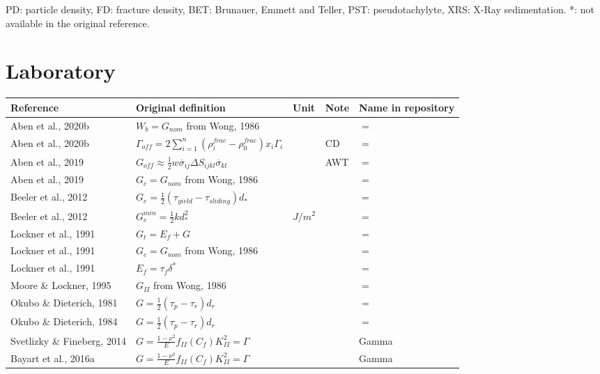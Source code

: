 \documentclass[12pt]{article}
\begin{document}
PD: particle density, FD: fracture density, BET: Brunauer, Emmett and Teller, PST: pseudotachylyte, XRS: X-Ray sedimentation.
*: not available in the original reference.

\section{Laboratory}

\begin{longtable}{|p{3.5 cm}|p{6.5 cm}|p{1.25 cm}|p{1.25 cm}|p{1.5 cm}|}
\hline
\textbf{Reference} & \textbf{Original definition} & \textbf{Unit} & \textbf{Note} & \textbf{Name in repository} \\ \hline
Aben et al., 2020b & \(\displaystyle W_b = G_{nom} \) from Wong, 1986 & & & $=$ \\
Aben et al., 2020b & \(\displaystyle \Gamma_{off} = 2 \sum_{i=1}^{n} (\rho_{i}^{frac}-\rho_{0}^{frac}) x_i \Gamma_i \) & & CD & $=$ \\
Aben et al., 2019 & \( \displaystyle G_{off} \approx \frac{1}{2} w \overline{\sigma}_{ij} \Delta S_{ijkl} \overline{\sigma}_{kl} \) & & AWT & $=$ \\
Aben et al., 2019 & \( \displaystyle G_c=G_{nom} \) from Wong, 1986 & & & $=$ \\
Beeler et al., 2012 & \( \displaystyle G_e = \frac{1}{2} (\tau_{yield}-\tau_{sliding}) d_* \) & & & $=$ \\
Beeler et al., 2012 & \( \displaystyle G_e^{min} = \frac{1}{2} k d_*^2 \) & $J/m^2$ & & $=$ \\
Lockner et al., 1991 & \( \displaystyle G_t = E_f + G \) & & & $=$ \\
Lockner et al., 1991 & \( \displaystyle G_c = G_{nom} \) from Wong, 1986 & & & $=$ \\
Lockner et al., 1991 & \( \displaystyle E_f = \tau_f \delta^* \)& & & $=$ \\
Moore \& Lockner, 1995 & \( \displaystyle G_{II} \) from Wong, 1986 & & & $=$ \\
Okubo \& Dieterich, 1981 & \( \displaystyle G = \frac{1}{2} (\tau_p - \tau_r) d_r \) & & & $=$ \\
Okubo \& Dieterich, 1984 & \( \displaystyle G = \frac{1}{2} (\tau_p - \tau_r) d_r \) & & & $=$ \\
Svetlizky \& Fineberg, 2014 & \( \displaystyle G = \frac{1-\nu^2}{E} f_{II}(C_f) K_{II}^2 = \Gamma \) & & & Gamma \\
Bayart et al., 2016a & \( \displaystyle G = \frac{1-\nu^2}{E} f_{II}(C_f) K_{II}^2 = \Gamma \) & & & Gamma \\

\end{longtable}
\end{document}
